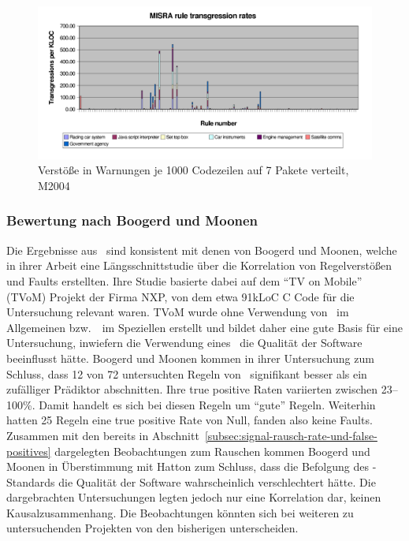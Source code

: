 \documentclass[a4paper,UKenglish,cleveref, autoref]{templates/lipics-v2019}
\begin{document}
    \begin{figure}[H]
        \centering
        \captionsetup{justification=centering,margin=2cm}
        \includegraphics[width=\textwidth]{graphics/2004-transgression-rates.png}
        \caption{Verstöße in Warnungen je 1000 Codezeilen auf 7 Pakete verteilt, M2004\cite{hatton2007language}}
        \label{fig:2004-transgression-rates}
    \end{figure}

    \subsubsection{Bewertung nach Boogerd und Moonen}
    Die Ergebnisse aus~\cite{hatton2007language} sind konsistent mit denen von Boogerd und Moonen, welche in
    ihrer Arbeit eine Längsschnittstudie über die Korrelation von Regelverstößen und Faults erstellten.\cite{boogerd2008assessing}
    Ihre Studie basierte dabei auf dem \enquote{TV on Mobile} (TVoM) Projekt der Firma NXP, von dem etwa 91kLoC C Code
    für die Untersuchung relevant waren.
    TVoM wurde ohne Verwendung von \sqss\ im Allgemeinen bzw.\ \misra\ im Speziellen erstellt und bildet daher eine gute
    Basis für eine Untersuchung, inwiefern die Verwendung eines \sqss\ die Qualität der Software beeinflusst hätte.
    Boogerd und Moonen kommen in ihrer Untersuchung zum Schluss, dass 12 von 72 untersuchten Regeln von \misra\ signifikant
    besser als ein zufälliger Prädiktor abschnitten.
    Ihre true positive Raten variierten zwischen 23--100\%.
    Damit handelt es sich bei diesen Regeln um \enquote{gute} Regeln.
    Weiterhin hatten 25 Regeln eine true positive Rate von Null, fanden also keine Faults.
    Zusammen mit den bereits in Abschnitt~\ref{subsec:signal-rausch-rate-und-false-positives} dargelegten Beobachtungen zum
    Rauschen kommen Boogerd und Moonen in Überstimmung mit Hatton zum Schluss, dass die Befolgung des \misra-Standards
    die Qualität der Software wahrscheinlich verschlechtert hätte.
    Die dargebrachten Untersuchungen legten jedoch nur eine Korrelation dar, keinen Kausalzusammenhang.
    Die Beobachtungen könnten sich bei weiteren zu untersuchenden Projekten von den bisherigen unterscheiden.
\end{document}
